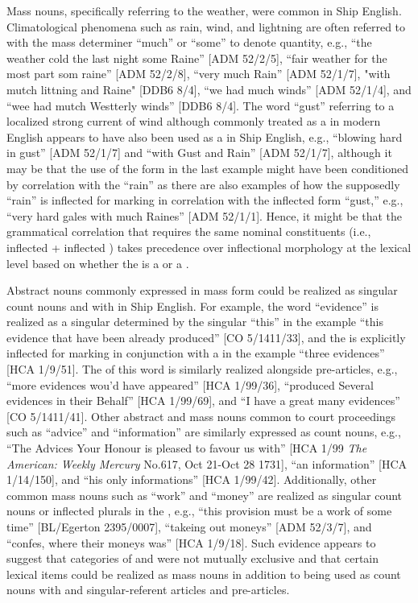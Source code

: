 Mass nouns, specifically referring to the weather, were common in Ship English. Climatological phenomena such as rain, wind, and lightning are often referred to with the mass determiner “much” or “some” to denote quantity, e.g., “the weather cold the last night some Raine” [ADM 52/2/5], “fair weather for the most part som raine” [ADM 52/2/8], “very much Rain” [ADM 52/1/7], "with mutch littning and Raine" [DDB6 8/4], “we had much winds” [ADM 52/1/4], and “wee had mutch Westterly winds” [DDB6 8/4]. The word “gust” referring to a localized strong current of wind although commonly treated as a  in modern English appears to have also been used as a  in Ship English, e.g., “blowing hard in gust” [ADM 52/1/7] and “with Gust and Rain” [ADM 52/1/7], although it may be that the use of the  form in the last example might have been conditioned by correlation with the  “rain” as there are also examples of how the supposedly  “rain” is inflected for  marking in correlation with the inflected form “gust,” e.g., “very hard gales with much Raines” [ADM 52/1/1]. Hence, it might be that the grammatical correlation that requires the same nominal constituents (i.e., inflected  + inflected ) takes precedence over inflectional morphology at the lexical level based on whether the  is a  or a . 

Abstract nouns commonly expressed in mass form could be realized as singular count nouns and with  in Ship English. For example, the word “evidence” is realized as a singular  determined by the singular  “this” in the example “this evidence that have been already produced” [CO 5/1411/33], and the  is explicitly inflected for  marking in conjunction with a  in the example “three evidences” [HCA 1/9/51]. The  of this word is similarly realized alongside  pre-articles, e.g., “more evidences wou’d have appeared” [HCA 1/99/36], “produced Several evidences in their Behalf” [HCA 1/99/69], and “I have a great many evidences” [CO 5/1411/41]. Other abstract and mass nouns common to court proceedings such as “advice” and “information” are similarly expressed as count nouns, e.g., “The Advices Your Honour is pleased to favour us with” [HCA 1/99 \textit{The American: Weekly Mercury} No.617, Oct 21-Oct 28 1731], “an information” [HCA 1/14/150], and “his only informations” [HCA 1/99/42]. Additionally, other common mass nouns such as “work” and “money” are realized as singular count nouns or inflected plurals in the , e.g., “this provision must be a work of some time” [BL/Egerton 2395/0007], “takeing out moneys” [ADM 52/3/7], and “confes, where their moneys was” [HCA 1/9/18]. Such evidence appears to suggest that categories of  and  were not mutually exclusive and that certain lexical items could be realized as  mass nouns in addition to being used as count nouns with  and singular-referent articles and pre-articles. 

